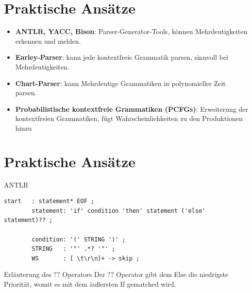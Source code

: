 \documentclass[t]{beamer}
\begin{document}
	\section{Praktische Ansätze}\label{sec:praktische-ansatze1}
	\begin{frame}
	\begin{itemize}
		\item \textbf{ANTLR, YACC, Bison}: Parser-Generator-Tools, können Mehrdeutigkeiten erkennen und melden.
		\vspace{1em}
		\item \textbf{Earley-Parser}: kann jede kontextfreie Grammatik parsen, sinnvoll bei Mehrdeutigkeiten.\cite{qi2018generalized}
		\vspace{1em}
		\item \textbf{Chart-Parser}: kann Mehrdeutige Grammatiken in polynomieller Zeit parsen.
		\vspace{1em}
		\item \textbf{Probabilistische kontextfreie Grammatiken (PCFGs)}: Erweiterung der kontextfreien Grammatiken, fügt Wahrscheinlichkeiten zu den Produktionen hinzu
	\end{itemize}
	\end{frame}


	\section{Praktische Ansätze}\label{sec:praktische-ansatze2}
	\begin{frame}[fragile]
		\begin{block}{ANTLR}
			\hspace*{-3.5em}
			\begin{minipage}{\textwidth+3.5em}
				\begin{lstlisting}[style=antlr,label={lst:lstlisting3}]
        start   : statement* EOF ;
        statement: 'if' condition 'then' statement ('else' statement)?? ;

        condition: '(' STRING ')' ;
        STRING   : '"' .*? '"' ;
	    WS       : [ \t\r\n]+ -> skip ;
				\end{lstlisting}
			\end{minipage}
		\end{block}
		\vspace{1em}
		\begin{exampleblock}{Erläuterung des \(??\) Operators}
			Der \(??\) Operator gibt dem Else die niedrigste Priorität, womit es mit dem äußersten If gematched wird.
		\end{exampleblock}\cite{parr}
	\end{frame}
\end{document}
